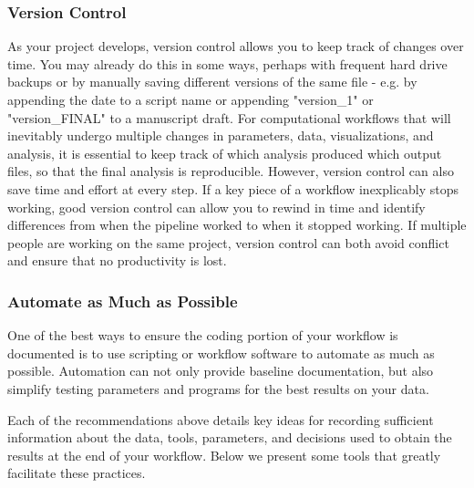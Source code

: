 \documentclass[10pt,letterpaper]{article}
\begin{document}
\subsubsection*{Version Control} 
As your project develops, version control allows you to keep track of changes over time. 
You may already do this in some ways, perhaps with frequent hard drive backups or by manually saving different versions of the same file  - e.g. by appending the date to a script name or appending "version\_1" or "version\_FINAL" to a manuscript draft. 
For computational workflows that will inevitably undergo multiple changes in parameters, data, visualizations, and analysis, it is essential to keep track of which analysis produced which output files, so that the final analysis is reproducible. 
However, version control can also save time and effort at every step. 
If a key piece of a workflow inexplicably stops working, good version control can allow you to rewind in time and identify differences from when the pipeline worked to when it stopped working. 
If multiple people are working on the same project, version control can both avoid conflict and ensure that no productivity is lost. 


 \subsubsection*{Automate as Much as Possible} 
One of the best ways to ensure the coding portion of your workflow is documented is to use scripting or workflow software to automate as much as possible. 
Automation can not only provide baseline documentation, but also simplify testing parameters and programs for the best results on your data. 

Each of the recommendations above details key ideas for recording sufficient information about the data, tools, parameters, and decisions used to obtain the results at the end of your workflow. 
Below we present some tools that greatly facilitate these practices.
 
\end{document}
